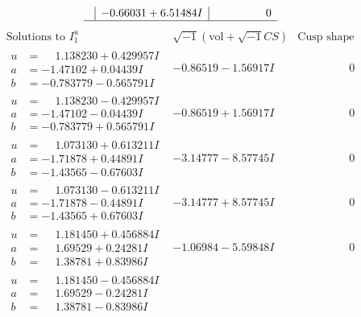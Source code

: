 \documentclass[1p]{elsarticle_modified}
\theoremstyle{definition}
\newcommand{\I}{\sqrt{-1}}
\begin{document}
$$\begin{array}{c|c|c}
 & -0.66031 + 6.51484 I & \phantom{-0.000000 } 0\\
 \hline 
 \end{array}$$\newpage$$\begin{array}{c|c|c}  
\text{Solutions to }I^u_{1}& \I (\text{vol} + \sqrt{-1}CS) & \text{Cusp shape}\\
 \hline 
\begin{aligned}
u &= \phantom{-}1.138230 + 0.429957 I \\
a &= -1.47102 + 0.04439 I \\
b &= -0.783779 - 0.565791 I\end{aligned}
 & -0.86519 - 1.56917 I & \phantom{-0.000000 } 0 \\ \hline\begin{aligned}
u &= \phantom{-}1.138230 - 0.429957 I \\
a &= -1.47102 - 0.04439 I \\
b &= -0.783779 + 0.565791 I\end{aligned}
 & -0.86519 + 1.56917 I & \phantom{-0.000000 } 0 \\ \hline\begin{aligned}
u &= \phantom{-}1.073130 + 0.613211 I \\
a &= -1.71878 + 0.44891 I \\
b &= -1.43565 - 0.67603 I\end{aligned}
 & -3.14777 - 8.57745 I & \phantom{-0.000000 } 0 \\ \hline\begin{aligned}
u &= \phantom{-}1.073130 - 0.613211 I \\
a &= -1.71878 - 0.44891 I \\
b &= -1.43565 + 0.67603 I\end{aligned}
 & -3.14777 + 8.57745 I & \phantom{-0.000000 } 0 \\ \hline\begin{aligned}
u &= \phantom{-}1.181450 + 0.456884 I \\
a &= \phantom{-}1.69529 + 0.24281 I \\
b &= \phantom{-}1.38781 + 0.83986 I\end{aligned}
 & -1.06984 - 5.59848 I & \phantom{-0.000000 } 0 \\ \hline\begin{aligned}
u &= \phantom{-}1.181450 - 0.456884 I \\
a &= \phantom{-}1.69529 - 0.24281 I \\
b &= \phantom{-}1.38781 - 0.83986 I\end{aligned}

\end{array}$$
\end{document}

